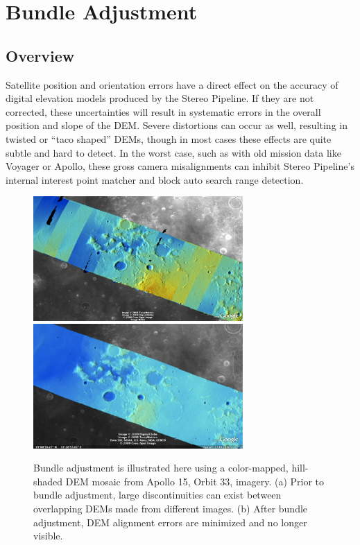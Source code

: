 \chapter{Bundle Adjustment}
\label{ch:bundle_adjustment}

\section{Overview}

\newenvironment{myindentpar}[1]
               {\begin{list}{}
                   {\setlength{\leftmargin}{#1}}
                 \item[]
               }
               {\end{list}}


Satellite position and orientation errors have a direct effect on the
accuracy of digital elevation models produced by the Stereo Pipeline.
If they are not corrected, these uncertainties will result in
systematic errors in the overall position and slope of the \ac{DEM}.
Severe distortions can occur as well, resulting in twisted or ``taco
shaped'' \acp{DEM}, though in most cases these effects are quite
subtle and hard to detect. In the worst case, such as with old mission
data like Voyager or Apollo, these gross camera misalignments can
inhibit Stereo Pipeline's internal interest point matcher and block
auto search range detection.
\begin{figure}[bt]
  \centering
  \includegraphics[width=8cm]{images/ba_orig.pdf}
  \includegraphics[width=8cm]{images/ba_adjusted.pdf}
  \caption{Bundle adjustment is illustrated here using a color-mapped,
    hill-shaded DEM mosaic from Apollo 15, Orbit 33, imagery. (a)
    Prior to bundle adjustment, large discontinuities can exist between
    overlapping DEMs made from different images. (b) After bundle
    adjustment, DEM alignment errors are minimized and no longer visible.}
  \label{fig:bundle_adjustment}
\end{figure}

